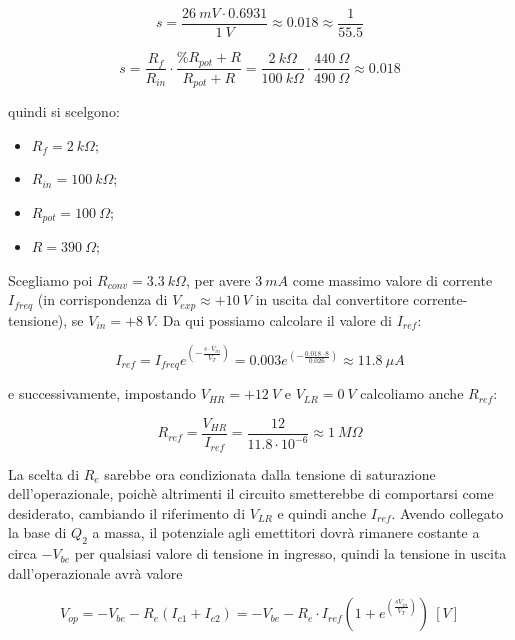 \begin{equation}\label{s2}
    s=\frac{26\ mV\cdot 0.6931}{1\ V}\approx0.018\approx\frac{1}{55.5}
\end{equation}

\begin{equation}\label{s3}
    s=\frac{R_f}{R_{in}}\cdot\frac{\%R_{pot}+R}{R_{pot}+R}
    =\frac{2\ k\Omega}{100\ k\Omega}\cdot\frac{440\ \Omega}{490\ \Omega}
    \approx 0.018
\end{equation}

quindi si scelgono:

\begin{itemize}
    \item $R_f = 2\ k\Omega$;
    \item $R_{in} = 100\ k\Omega$;
    \item $R_{pot} = 100\ \Omega$;
    \item $R = 390\ \Omega$;
\end{itemize}

Scegliamo poi $R_{conv}=3.3\ k\Omega$, per avere $3\ mA$ come massimo valore di corrente
$I_{freq}$ (in corrispondenza di $V_{exp}\approx+10\ V$ in uscita dal convertitore
corrente-tensione), se $V_{in}=+8\ V$. Da qui possiamo calcolare il valore di $I_{ref}$:

\begin{equation}\label{iref_calc}
    I_{ref}=I_{freq}e^{\left(-\frac{s\cdot V_{in}}{V_T}\right)}
    =0.003e^{\left(-\frac{0.018\cdot8}{0.026}\right)}
    \approx11.8\ \mu A
\end{equation}

e successivamente, impostando $V_{HR}=+12\ V$ e $V_{LR}=0\ V$ calcoliamo anche $R_{ref}$:

\begin{equation}\label{rref_calc}
    R_{ref}=\frac{V_{HR}}{I_{ref}}=\frac{12}{11.8\cdot10^{-6}}\approx 1\ M\Omega
\end{equation}

La scelta di $R_e$ sarebbe ora condizionata dalla tensione di saturazione dell'operazionale,
poichè altrimenti il circuito smetterebbe di comportarsi come desiderato, cambiando il
riferimento di $V_{LR}$ e quindi anche $I_{ref}$. Avendo collegato la base di $Q_2$ a massa,
il potenziale agli emettitori dovrà rimanere costante a circa $-V_{be}$ per qualsiasi valore
di tensione in ingresso, quindi la tensione in uscita dall'operazionale avrà valore

\begin{equation}
    V_{op}=-V_{be}-R_e(I_{c1}+I_{c2})=%
    -V_{be}-R_e\cdot I_{ref}\left(1+e^{\left(\frac{sV_{in}}{V_T}\right)}\right)\ [V]
\end{equation}

